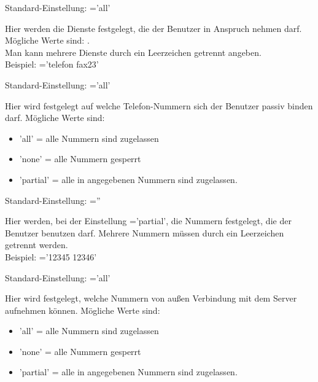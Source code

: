\begin{description}

        Standard-Einstellung: ='all'

        Hier werden die Dienste festgelegt, die der Benutzer in Anspruch nehmen darf.
        Mögliche Werte sind: . \\
        Man kann mehrere Dienste durch ein Leerzeichen getrennt angeben. \\
        Beispiel: ='telefon fax23'


        Standard-Einstellung: ='all'

        Hier wird festgelegt auf welche Telefon-Nummern sich der Benutzer passiv binden darf.
        Mögliche Werte sind:
        \begin{itemize}
            \item 'all' = alle Nummern sind zugelassen
            \item 'none' = alle Nummern gesperrt
            \item 'partial' = alle in
                angegebenen Nummern sind zugelassen.
        \end{itemize}


        Standard-Einstellung: =''

        Hier werden, bei der Einstellung ='partial', die Nummern festgelegt,
        die der Benutzer benutzen darf.
        Mehrere Nummern müssen durch ein Leerzeichen getrennt werden. \\
        Beispiel: ='12345 12346'


        Standard-Einstellung: ='all'

        Hier wird festgelegt, welche Nummern von außen Verbindung mit dem Server aufnehmen können.
        Mögliche Werte sind:
        \begin{itemize}
            \item 'all' = alle Nummern sind zugelassen
            \item 'none' = alle Nummern gesperrt
            \item 'partial' = alle in
                angegebenen Nummern sind zugelassen.
        \end{itemize}


\end{description}
